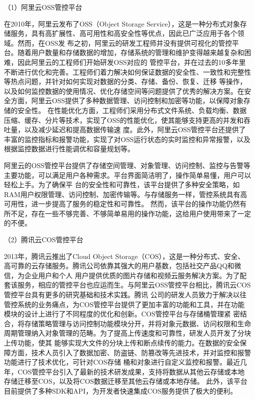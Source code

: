 
（1）阿里云OSS管控平台

在2010年，阿里云发布了OSS（Object Storage Service），这是一种分布式对象存储服务，具有高扩展性、高可用性和高安全性等优点，因此已广泛应用于各个领域\cite{knuth84}。然而，在OSS发
布之初，阿里云的研发工程师并没有提供可视化的管控平台。随着用户数量和存储数据的增加，存储系统的管理和维护变得越来越复杂和困难，因此阿里云的工程师们开始研发OSS对应的
管控平台，并在过去的10多年里不断进行优化和完善。工程师们着力解决如何保证数据的安全性、一致性和完整性等热点问题，并针对如何实现对数据的分类、存储、备份、恢复、迁移
等操作，以及如何监控数据的使用情况、优化存储空间等问题提供了优秀的解决方案。在安全方面，阿里云OSS提供了多种数据管理、访问控制和加密等功能，以保障对象存储的安全性\cite{kongqingyong2015keji}。
在性能优化方面，工程师们采用分布式文件系统、负载均衡、数据压缩、缓存、分片等技术，实现了OSS的性能优化，使其能够支持更高的并发和吞吐量，以及减少延迟和提高数据传输速
度。此外，阿里云OSS管控平台还提供了丰富的监控指标和报警功能，实现了对OSS运行状态的实时监控和异常报警，以及根据监控数据进行性能调优和容量规划等。

阿里云的OSS管控平台提供了存储空间管理、对象管理、访问控制、监控与告警等主要功能，可以满足用户各种需求。平台界面简洁明了，操作简单易懂，用户可以轻松上手。为了确保平
台的安全性和可靠性，该平台提供了多种安全策略，如RAM用户权限管理、访问控制、加密传输等。与存储服务一样，管控系统具有高可用性，进一步提高了服务的稳定性和可靠性。
然而，该平台的操作功能仍然有所不足，存在一些不够完善、不够简单易用的操作功能，这给用户使用带来了一定的不便。

（2）腾讯云COS管控平台


2013年，腾讯云推出了Cloud Object Storage（COS），这是一种分布式、安全、高可靠的云存储服务。腾讯公司依靠其强大的用户基数，包括社交产品QQ和微信，为企业用户和个人
用户提供优质的图片存储和视频云服务解决方案\cite{kongq2015keji}。为了配套该服务，相应的管控平台也应运而生。与阿里云OSS管控平台相比，腾讯云COS管控平台具有更多的研究基础和技术实践。腾讯
公司的研发人员致力于解决以往管控系统的业务痛点，为COS管控平台提供了更加丰富的功能和工具，并在功能模块的设计上进行了不同程度的优化和创新。COS管控平台与存储桶管理紧
密结合，将存储策略管理与访问控制功能模块分开，并将对象元数据、访问权限和生命周期管理纳入对象管理的范畴。为了提高上传速度和可靠性，研发人员开发了分块上传功能，使其
能够实现大文件的分块上传和断点续传的能力。在数据的安全保障方面，技术人员引入了数据加密、防盗链、防篡改等先进技术，并对监控和报警功能进行了技术优化，可针对COS存储
桶和对象进行自定义监控和报警。最近几年，COS管控平台引入了最新的技术研发成果，支持将数据从其他云存储或本地存储迁移至COS，以及将COS数据迁移至其他云存储或本地存储。
此外，该平台目前提供了多种SDK和API，为开发者快速集成COS服务提供了极大的便利。


